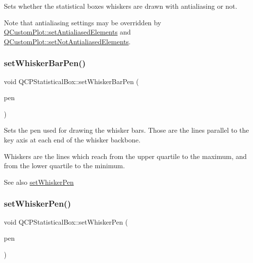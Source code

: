 Sets whether the statistical boxes whiskers are drawn with antialiasing or not.

Note that antialiasing settings may be overridden by \hyperlink{class_q_custom_plot_af6f91e5eab1be85f67c556e98c3745e8}{Q\+Custom\+Plot\+::set\+Antialiased\+Elements} and \hyperlink{class_q_custom_plot_ae10d685b5eabea2999fb8775ca173c24}{Q\+Custom\+Plot\+::set\+Not\+Antialiased\+Elements}. \mbox{\label{class_q_c_p_statistical_box_aa8d3e503897788e1abf68dc74b5f147f}} 
\subsubsection{\texorpdfstring{set\+Whisker\+Bar\+Pen()}{setWhiskerBarPen()}}
{\footnotesize\ttfamily void Q\+C\+P\+Statistical\+Box\+::set\+Whisker\+Bar\+Pen (\begin{DoxyParamCaption}\item[{const Q\+Pen \&}]{pen }\end{DoxyParamCaption})}

Sets the pen used for drawing the whisker bars. Those are the lines parallel to the key axis at each end of the whisker backbone.

Whiskers are the lines which reach from the upper quartile to the maximum, and from the lower quartile to the minimum.

\begin{DoxySeeAlso}{See also}
\hyperlink{class_q_c_p_statistical_box_a4a5034cb3b9b040444df05ab1684620b}{set\+Whisker\+Pen} 
\end{DoxySeeAlso}
\mbox{\label{class_q_c_p_statistical_box_a4a5034cb3b9b040444df05ab1684620b}} 
\subsubsection{\texorpdfstring{set\+Whisker\+Pen()}{setWhiskerPen()}}
{\footnotesize\ttfamily void Q\+C\+P\+Statistical\+Box\+::set\+Whisker\+Pen (\begin{DoxyParamCaption}\item[{const Q\+Pen \&}]{pen }\end{DoxyParamCaption})}

